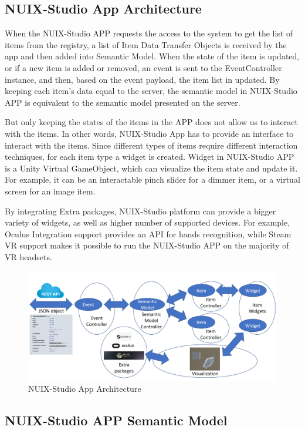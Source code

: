 \subsection{NUIX-Studio App Architecture}

When the NUIX-Studio APP requests the access to the system to get the list of items from the registry, a list of Item Data Transfer Objects is received by the app and then added into Semantic Model. When the state of the item is updated, or if a new item is added or removed, an event is sent to the EventController instance, and then, based on the event payload, the item list in updated.  By keeping each item’s data equal to the server, the semantic model in NUIX-Studio APP is equivalent to the semantic model presented on the server. 

But only keeping the states of the items in the APP does not allow us to interact with the items. In other words, NUIX-Studio App has to provide an interface to interact with the items. Since different types of items require different interaction techniques, for each item type a widget is created.
Widget in NUIX-Studio APP is a Unity Virtual GameObject, which can visualize the item state and update it. For example, it can be an interactable pinch slider for a dimmer item, or a virtual screen  for an image item.

By integrating Extra packages, NUIX-Studio platform can provide a bigger variety of widgets, as well as higher number of supported devices. For example, Oculus Integration support provides an API for hands recognition, while Steam VR support makes it possible to run the NUIX-Studio APP on the majority of VR headsets.

\begin{figure}
  \centering
  \includegraphics[width=0.9\linewidth]{figures/AppArchitecture.png}
  \caption{NUIX-Studio App Architecture}
  \label{fig:AppArchitecture-figure}
\end{figure}

\subsection{NUIX-Studio APP Semantic Model}

